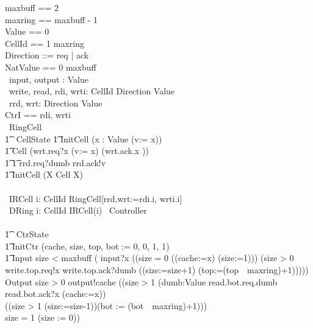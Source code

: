 \documentclass[10pt]{article}
\begin{document}
\begin{circus}

maxbuff == 2 \\
maxring == maxbuff - 1 \\
Value == 0  \\
CellId == 1 \upto maxring \\
Direction ::=  req | ack\\
NatValue == 0 \upto maxbuff\\
\also \circchannel\ input, output : Value \\
\circchannel\ write, read, rdi, wrti: CellId \cross Direction \cross Value \\
\circchannel\ rrd, wrt: Direction \cross Value \\
\circchannelset CtrI == \lchanset rdi, wrti \rchanset \\

\circprocess\ RingCell \circdef\\
\circbegin
\t1 \circstate\ CellState 
\t1 InitCell \circdef (\Intchoice x : Value \circspot (v:= x)) \\
\t1 Cell \circdef (wrt.req?x \then (v:= x) \circseq (wrt.ack.x \then \Skip))  \\
\t1 \t1         \extchoice rrd.req?dumb \then rrd.ack!v \then \Skip \\
\t1 \circspot InitCell \circseq (\circmu X \circspot Cell \circseq X)
\\
\circend
\\
\circprocess\ IRCell \circdef i: CellId \circspot RingCell[rrd,wrt:=rdi.i, wrti.i]
\\
\circprocess\ DRing \circdef \Interleave i: CellId \circspot IRCell(i)
\also
\circprocess\ Controller \circdef \\
\circbegin\\
\t1 \circstate\ CtrState  \\

\t1 InitCtr \circdef (cache, size, top, bot := 0, 0, 1, 1) \\
\t1 Input \circdef
	\lcircguard size < maxbuff \rcircguard
		\circguard (
        input?x \then
        ((\lcircguard size = 0 \rcircguard
                  \circguard ((cache:=x) \circseq (size:=1)))
                \extchoice
                (\lcircguard size > 0 \rcircguard
                  \circguard
                    write.top.req!x \then
                    write.top.ack?dumb \then
                    ((size:=size+1) \circseq
                    (top:=(top~\mod~maxring)+1)))))
    \\
 Output \circdef
\lcircguard size > 0 \rcircguard
\circguard
    output!cache \then
    ((\lcircguard size > 1 \rcircguard \circguard
          (\Intchoice dumb:Value \circspot read.bot.req.dumb \then read.bot.ack?x \then (cache:=x)) \circseq \\
          ((\lcircguard size > 1 \rcircguard \circguard (size:=size-1))\circseq (bot := (bot~\mod~maxring)+1)))\\
      \extchoice \lcircguard size = 1 \rcircguard \circguard (size := 0)) \\


\end{circus}
\end{document}
